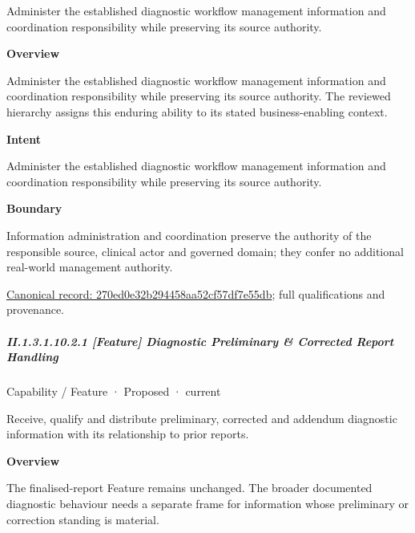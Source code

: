 Administer the established diagnostic workflow management information and coordination responsibility while preserving its source authority.



\textbf{Overview}



Administer the established diagnostic workflow management information and coordination responsibility while preserving its source authority. The reviewed hierarchy assigns this enduring ability to its stated business-enabling context.



\textbf{Intent}



Administer the established diagnostic workflow management information and coordination responsibility while preserving its source authority.



\textbf{Boundary}



Information administration and coordination preserve the authority of the responsible source, clinical actor and governed domain; they confer no additional real-world management authority.


{\footnotesize \href{../../../../../../../continuum/strategy/capability/270ed0e32b294458aa52cf57df7e55db.md}{Canonical record: 270ed0e32b294458aa52cf57df7e55db}; full qualifications and provenance.}\par
\subparagraph*{II.1.3.1.10.2.1 [Feature] Diagnostic Preliminary \& Corrected Report Handling}
\label{navigation:II.1.3.1.10.2.1}

\label{element:7449ee4dada7424ea6d39785258b4981}
{\small Capability / Feature · Proposed · current}\par

Receive, qualify and distribute preliminary, corrected and addendum diagnostic information with its relationship to prior reports.



\textbf{Overview}



The finalised-report Feature remains unchanged. The broader documented diagnostic behaviour needs a separate frame for information whose preliminary or correction standing is material.



